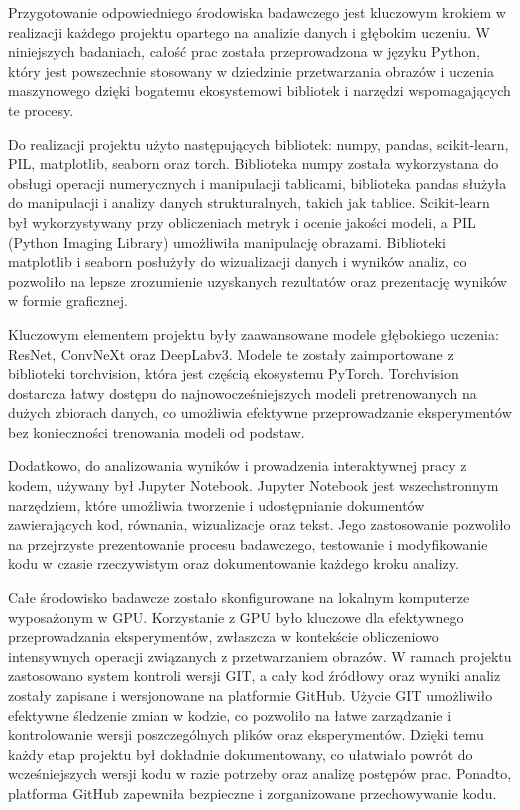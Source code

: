 Przygotowanie odpowiedniego środowiska badawczego jest kluczowym krokiem w realizacji każdego projektu opartego na 
analizie danych i głębokim uczeniu. W niniejszych badaniach, całość prac została przeprowadzona w języku Python, który 
jest powszechnie stosowany w dziedzinie przetwarzania obrazów i uczenia maszynowego dzięki bogatemu ekosystemowi 
bibliotek i narzędzi wspomagających te procesy.

Do realizacji projektu użyto następujących bibliotek: numpy, pandas, scikit-learn, PIL, matplotlib, seaborn oraz torch. 
Biblioteka numpy została wykorzystana do obsługi operacji numerycznych i manipulacji tablicami, biblioteka pandas służyła 
do manipulacji i analizy danych strukturalnych, takich jak tablice. Scikit-learn był wykorzystywany przy obliczeniach 
metryk i ocenie jakości modeli, a PIL (Python Imaging Library) umożliwiła manipulację obrazami. Biblioteki matplotlib i 
seaborn posłużyły do wizualizacji danych i wyników analiz, co pozwoliło na lepsze zrozumienie uzyskanych rezultatów oraz 
prezentację wyników w formie graficznej.

Kluczowym elementem projektu były zaawansowane modele głębokiego uczenia: ResNet, ConvNeXt oraz DeepLabv3. Modele te 
zostały zaimportowane z biblioteki torchvision, która jest częścią ekosystemu PyTorch. Torchvision dostarcza łatwy 
dostępu do najnowocześniejszych modeli pretrenowanych na dużych zbiorach danych, co umożliwia efektywne przeprowadzanie 
eksperymentów bez konieczności trenowania modeli od podstaw.

Dodatkowo, do analizowania wyników i prowadzenia interaktywnej pracy z kodem, używany był Jupyter Notebook. Jupyter 
Notebook jest wszechstronnym narzędziem, które umożliwia tworzenie i udostępnianie dokumentów zawierających kod, 
równania, wizualizacje oraz tekst. Jego zastosowanie pozwoliło na przejrzyste prezentowanie procesu badawczego, 
testowanie i modyfikowanie kodu w czasie rzeczywistym oraz dokumentowanie każdego kroku analizy.

Całe środowisko badawcze zostało skonfigurowane na lokalnym komputerze wyposażonym w GPU. Korzystanie z GPU było kluczowe
dla efektywnego przeprowadzania eksperymentów, zwłaszcza w kontekście obliczeniowo intensywnych operacji związanych z 
przetwarzaniem obrazów. W ramach projektu zastosowano system kontroli wersji GIT, a cały kod źródłowy oraz wyniki 
analiz zostały zapisane i wersjonowane na platformie GitHub. Użycie GIT umożliwiło efektywne śledzenie zmian w kodzie, 
co pozwoliło na łatwe zarządzanie i kontrolowanie wersji poszczególnych plików oraz eksperymentów. Dzięki temu każdy 
etap projektu był dokładnie dokumentowany, co ułatwiało powrót do wcześniejszych wersji kodu w razie potrzeby oraz 
analizę postępów prac. Ponadto, platforma GitHub zapewniła bezpieczne i zorganizowane przechowywanie kodu.

